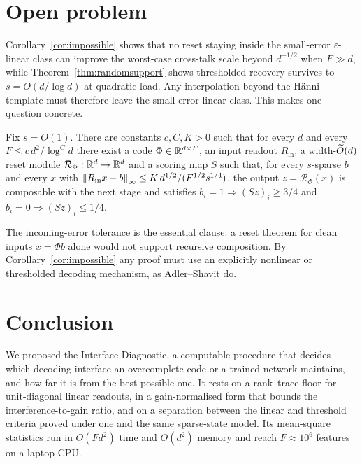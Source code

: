 \section{Open problem}
\label{sec:open}

Corollary~\ref{cor:impossible} shows that no reset staying inside the small-error
$\varepsilon$-linear class can improve the worst-case cross-talk scale beyond $d^{-1/2}$ when
$F\gg d$, while Theorem~\ref{thm:randomsupport} shows thresholded recovery survives to
$s=O(d/\log d)$ at quadratic load. Any interpolation beyond the H\"{a}nni template must
therefore leave the small-error linear class. This makes one question concrete.

\begin{conjecture}
\label{conj:reset}
Fix $s=O(1)$. There are constants $c,C,K>0$ such that for every $d$ and every
$F\le c\,d^2/\log^C d$ there exist a code $\Phi\in\mathbb{R}^{d\times F}$, an input readout
$R_{\mathrm{in}}$, a width-$\widetilde{O}(d)$ reset module $\mathcal R_\Phi:\mathbb{R}^d\to\mathbb{R}^d$ and a
scoring map $S$ such that, for every $s$-sparse $b$ and every $x$ with
$\left\lVert R_{\mathrm{in}}x-b \right\rVert_\infty\le K\,d^{1/2}/(F^{1/2}s^{1/4})$, the output
$z=\mathcal R_\Phi(x)$ is composable with the next stage and satisfies
$b_i=1\Rightarrow(Sz)_i\ge3/4$ and $b_i=0\Rightarrow(Sz)_i\le1/4$.
\end{conjecture}

The incoming-error tolerance is the essential clause: a reset theorem for clean inputs
$x=\Phi b$ alone would not support recursive composition. By
Corollary~\ref{cor:impossible} any proof must use an explicitly nonlinear or thresholded
decoding mechanism, as Adler--Shavit do.

\section{Conclusion}
\label{sec:conclusion}

We proposed the Interface Diagnostic, a computable procedure that decides which decoding
interface an overcomplete code or a trained network maintains, and how far it is from the best
possible one. It rests on a rank--trace floor for unit-diagonal linear readouts, in a
gain-normalised form that bounds the interference-to-gain ratio, and on a separation between the
linear and threshold criteria proved under one and the same sparse-state model. Its mean-square
statistics run in $O(Fd^2)$ time and $O(d^2)$ memory and reach $F\approx10^6$ features on a
laptop CPU.

